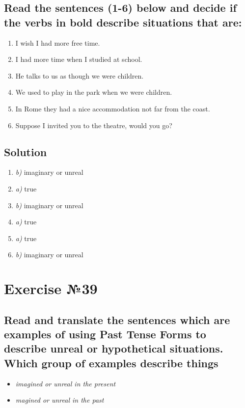 \subsection*{Read the sentences (1-6) below and decide if the verbs in bold describe situations that are:}
\begin{enumerate}
      \item I wish I had more free time.
      \item I had more time when I studied at school.
      \item He talks to us as though we were children.
      \item We used to play in the park when we were children.
      \item In Rome they had a nice accommodation not far from the coast.
      \item Suppose I invited you to the theatre, would you go?
\end{enumerate}

\subsection*{Solution}
\begin{enumerate}
      \item \textit{b)} imaginary or unreal
      \item \textit{a)} true
      \item \textit{b)} imaginary or unreal
      \item \textit{a)} true
      \item \textit{a)} true
      \item \textit{b)} imaginary or unreal
\end{enumerate}

\section{Exercise №39}
\subsection*{Read and translate the sentences which are examples of using Past Tense Forms to
      describe unreal or hypothetical situations. Which group of examples describe things}
\begin{itemize}
      \item \textit{imagined or unreal in the present}
      \item \textit{magined or unreal in the past}
\end{itemize}

